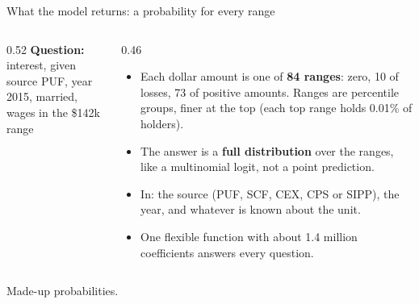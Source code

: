 \documentclass[11pt,aspectratio=169]{beamer}
\newcommand{\slidenote}[1]{\par\vfill{\scriptsize\color{yalegrey}#1}}
\begin{document}
\begin{frame}{What the model returns: a probability for every range}
  \begin{columns}[c]
    \begin{column}{0.52\textwidth}
      \centering
      {\small\textbf{Question:} interest, given\\
       source PUF, year 2015, married, wages in the \$142k range}\\[0.6em]
    \end{column}
    \begin{column}{0.46\textwidth}
      \footnotesize
      \begin{itemize}
        \item Each dollar amount is one of \textbf{84 ranges}: zero, 10 of losses,
              73 of positive amounts. Ranges are percentile groups, finer at the top
              (each top range holds 0.01\% of holders).
        \item The answer is a \textbf{full distribution} over the ranges, like a
              multinomial logit, not a point prediction.
        \item In: the source (PUF, SCF, CEX, CPS or SIPP), the year, and whatever
              is known about the unit.
        \item One flexible function with about 1.4 million coefficients answers every question.
      \end{itemize}
    \end{column}
  \end{columns}
  \slidenote{Made-up probabilities.}
\end{frame}
\end{document}
